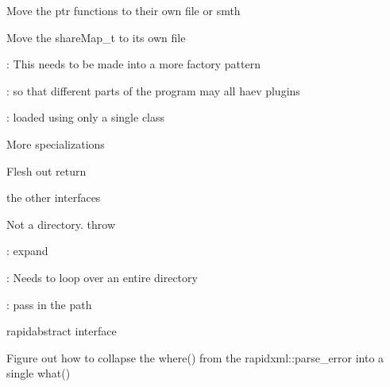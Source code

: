 \begin{DoxyRefList}
\label{todo__todo000016}%
%
Move the ptr functions to their own file or smth 

Move the share\+Map\+\_\+t to its own file  
\item[Namespace \mbox{\hyperlink{namespacePluginLoader}{Plugin\+Loader}} ]\label{todo__todo000012}%
%
\+: This needs to be made into a more factory pattern 

\+: so that different parts of the program may all haev plugins 

\+: loaded using only a single class  
\item[Module \mbox{\hyperlink{group__PluginLoader}{Plugin\+Loader}} ]\label{todo__todo000020}%
%
More specializations  
\item[Member \mbox{\hyperlink{classPluginLoader_1_1PluginLoader_ad8d58265abe6e32b168651f47e3022ba}{Plugin\+Loader::Plugin\+Loader::Scan\+For\+All\+Plugins\+Default\+Loc}} () override]\label{todo__todo000019}%
%
Flesh out return  
\item[Class \mbox{\hyperlink{classPluginLoader_1_1PluginLoaderTemplate}{Plugin\+Loader::Plugin\+Loader\+Template$<$ Tplugin\+Type $>$}} ]\label{todo__todo000021}%
%
the other interfaces  
\item[Member \mbox{\hyperlink{classPluginLoader_1_1PluginLoaderTemplate_a8d969fc7c5f2848afef9a3a8255876ec}{Plugin\+Loader::Plugin\+Loader\+Template$<$ Tplugin\+Type $>$::Scan\+For\+Plugins}} (std\+::string new\+Dir)]\label{todo__todo000022}%
%
Not a directory. throw  
\item[Member \mbox{\hyperlink{classPluginLoader_1_1ProtocolPluginHandler_a05cf352c880a167e5754e76e14b3db8c}{Plugin\+Loader::Protocol\+Plugin\+Handler::Protocol\+Plugin\+Handler}} ()]\label{todo__todo000017}%
%
\+: expand 

\+: Needs to loop over an entire directory 

\label{todo__todo000018}%
%
\+: pass in the path  
\item[Module \mbox{\hyperlink{group__testAnalyser2}{test\+Analyser2}} ]\label{todo__todo000024}%
%
rapidabstract interface 

\label{todo__todo000025}%
%
Figure out how to collapse the where() from the rapidxml\+::parse\+\_\+error into a single what() 


\end{DoxyRefList}
